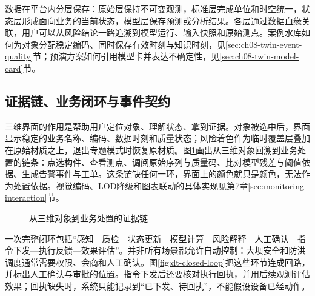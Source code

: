 数据在平台内分层保存：原始层保持不可变观测，标准层完成单位和时空统一，状态层形成面向业务的当前状态，模型层保存预测或分析结果。各层通过数据血缘关联，用户可以从风险结论一路追溯到模型运行、输入快照和原始测点。案例水库如何为对象分配稳定编码、同时保存有效时刻与知识时刻，见\ref{sec:ch08-twin-event-quality}节；预演方案如何引用模型卡并表达不确定性，见\ref{sec:ch08-twin-model-card}节。

\subsection{证据链、业务闭环与事件契约}\label{sec:ch06-twin-contract}

三维界面的作用是帮助用户定位对象、理解状态、拿到证据。对象被选中后，界面显示稳定的业务名称、编码、数据时刻和质量状态；风险着色作为临时覆盖层叠加在原始材质之上，退出专题模式时恢复原材质。图\ref{fig:dt-evidence-chain}画出从三维对象回溯到业务处置的链条：点选构件、查看测点、调阅原始序列与质量码、比对模型残差与阈值依据、生成告警事件与工单。这条链缺任何一环，界面上的颜色就只是颜色，无法作为处置依据。视觉编码、LOD降级和图表联动的具体实现见第7章\ref{sec:monitoring-interaction}节。

\begin{figure}[htbp]
\centering
{}
\caption{从三维对象到业务处置的证据链}
\label{fig:dt-evidence-chain}
\end{figure}

一次完整闭环包括“感知—质检—状态更新—模型计算—风险解释—人工确认—指令下发—执行反馈—效果评估”。并非所有场景都允许自动控制：大坝安全和防洪调度通常需要权限、会商和人工确认。图\ref{fig:dt-closed-loop}把这些环节连成回路，并标出人工确认与审批的位置。指令下发后还要核对执行回执，并用后续观测评估效果；回执缺失时，系统只能记录到“已下发、待回执”，不能假设设备已经动作。

